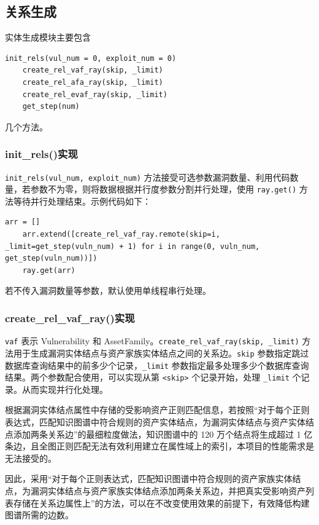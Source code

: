 \documentclass[a4paper,AutoFakeBold,oneside,12pt]{book}
\begin{document}
\subsection{关系生成}

实体生成模块主要包含
\begin{lstlisting}[style = python]
	init_rels(vul_num = 0, exploit_num = 0)
	create_rel_vaf_ray(skip, _limit)
	create_rel_afa_ray(skip, _limit)
	create_rel_evaf_ray(skip, _limit)
	get_step(num)
\end{lstlisting}
几个方法。

\subsubsection{init{\_}rels()实现}

\lstinline|init_rels(vul_num, exploit_num)| 方法接受可选参数漏洞数量、利用代码数量，若参数不为零，则将数据根据并行度参数分割并行处理，使用 \lstinline|ray.get()| 方法等待并行处理结束。示例代码如下：
\begin{lstlisting}[style = python]
	arr = []
	arr.extend([create_rel_vaf_ray.remote(skip=i, _limit=get_step(vuln_num) + 1) for i in range(0, vuln_num, get_step(vuln_num))])
	ray.get(arr)
\end{lstlisting}

若不传入漏洞数量等参数，默认使用单线程串行处理。

\subsubsection{create{\_}rel{\_}vaf{\_}ray()实现}

\lstinline|vaf| 表示 Vulnerability 和 AssetFamily。\lstinline|create_rel_vaf_ray(skip, _limit)| 方法用于生成漏洞实体结点与资产家族实体结点之间的关系边。\lstinline|skip| 参数指定跳过数据库查询结果中的前多少个记录，\lstinline|_limit| 参数指定最多处理多少个数据库查询结果。两个参数配合使用，可以实现从第 \lstinline|<skip>| 个记录开始，处理 \lstinline|_limit| 个记录。从而实现并行化处理。

根据漏洞实体结点属性中存储的受影响资产正则匹配信息，若按照“对于每个正则表达式，匹配知识图谱中符合规则的资产实体结点，为漏洞实体结点与资产实体结点添加两条关系边”的最细粒度做法，知识图谱中的 120 万个结点将生成超过 1 亿条边，且全图正则匹配无法有效利用建立在属性域上的索引，本项目的性能需求是无法接受的。

因此，采用“对于每个正则表达式，匹配知识图谱中符合规则的资产家族实体结点，为漏洞实体结点与资产家族实体结点添加两条关系边，并把真实受影响资产列表存储在关系边属性上”的方法，可以在不改变使用效果的前提下，有效降低构建图谱所需的边数。
\end{document}
